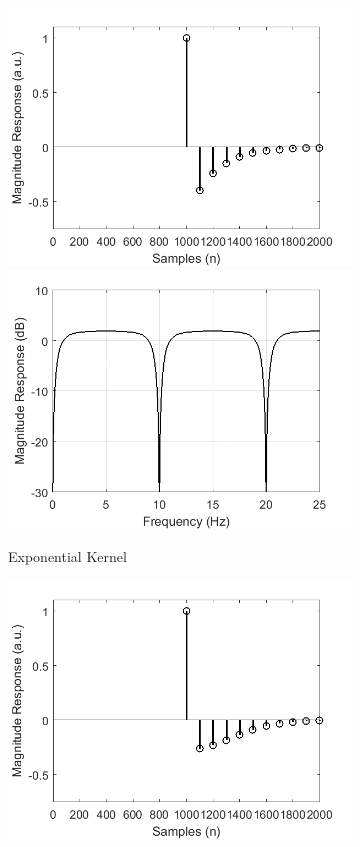 \documentclass[a4paper]{article}
\begin{document}
\begin{figure}[hbtp]
\begin{subfigure}{.245\textwidth}
        \includegraphics[width=\textwidth]{img/kernel_exp.png}\\
        \includegraphics[width=\textwidth]{img/mag_exp.png}
        \caption{Exponential Kernel}\label{fig:ExponentialKernel}
    \end{subfigure}
    \begin{subfigure}{.245\textwidth}
        \includegraphics[width=\textwidth]{img/kernel_gauss.png}\\

\end{subfigure}
\end{figure}
\end{document}
